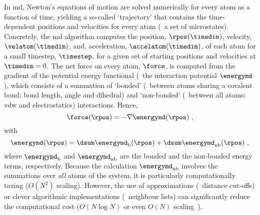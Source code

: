 In \gls{md}, Newton's equations of motion are solved numerically for every atom as a function of time,
yielding a so-called `trajectory' that contains the time-dependent positions and velocities for every atom
(\ie~a set of microstates). Concretely, the \gls{md} algorithm computes the position, $\rpos(\timedim)$,
velocity, $\velatom(\timedim)$, and, acceleration, $\accelatom(\timedim)$, of each atom for a small
timestep\footnotemark, $\timestep$, for a given set of starting positions and velocities at $\timedim = 0$.%
%
%
The net force on every atom, $\force$, is computed from the gradient of the potential energy functional
(\ie~the interaction potential $\energymd$), which consists of a summation of `bonded' (\ie~between atoms
sharing a covalent bond: bond length, angle and dihedral) and `non-bonded' (\ie~between all atoms: \gls{vdw}
and electrostatics) interactions. Hence,
%
\begin{equation}\label{eq:nanopores_md_force}
  \force (\rpos) = - \nabla \energymd (\rpos)
  \text{ ,}
\end{equation}
%
with
%
\begin{equation}\label{eq:nanopores_md_energy}
  \energymd (\rpos) = \dsum \energymd_{\text{b}} (\rpos) + \dsum \energymd_{\text{nb}} (\rpos)
  \text{ ,}
\end{equation}
%
where $\energymd_{\text{b}}$ and $\energymd_{\text{nb}}$ are the bonded and the non-bonded energy terms,
respectively. Because the calculation $\energymd_{\text{nb}}$ involves the summations over \emph{all} atoms of
the system, it is particularly computationally taxing ($O(N^2)$ scaling). However, the use of approximations
(\eg~distance cut-offs) or clever algorithmic implementations (\eg~neighbour lists) can significantly reduce
the computational cost ($O(N\log N)$ or even $O(N)$ scaling~\cite{Eastman-2010}).

